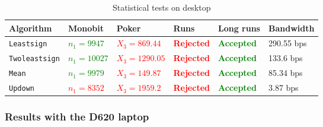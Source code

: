 \documentclass[a4paper]{article}           %
\begin{document}
  \begin{table}[H]
    \begin{center}
      \begin{tabular}{| l | p{1.8cm} | p{2.1cm} | l | l | l |}
        \hline
        Algorithm  & Monobit & Poker & Runs & Long runs & Bandwidth\\
        \hline
        \hline
        \texttt{Leastsign} & \textcolor{green}{$n_1 = 9947$}
        & \textcolor{red}{$X_3 = 869.44$}
        & \textcolor{red}{\textbf{Rejected}}
        & \textcolor{green}{\textbf{Accepted}}
        & 290.55 bps \\

        \texttt{Twoleastsign} & \textcolor{green}{$n_1 = 10027$}
        & \textcolor{red}{$X_3 = 1290.05$}
        & \textcolor{red}{\textbf{Rejected}}
        & \textcolor{green}{\textbf{Accepted}}
        & 133.6 bps \\

        \texttt{Mean} & \textcolor{green}{$n_1 = 9979$}
        & \textcolor{red}{$X_3 = 149.87$}
        & \textcolor{red}{\textbf{Rejected}}
        & \textcolor{green}{\textbf{Accepted}}
        & 85.34 bps \\

        \texttt{Updown} & \textcolor{red}{$n_1 = 8352$}
        & \textcolor{red}{$X_3 = 1959.2$}
        & \textcolor{red}{\textbf{Rejected}}
        & \textcolor{green}{\textbf{Accepted}}
        & 3.87 bps \\

        \hline
      \end{tabular}
    \end{center}
    \label{tab:res0}
    \caption{Statistical tests on desktop}
  \end{table}



\subsubsection{Results with the D620 laptop}
\end{document}
